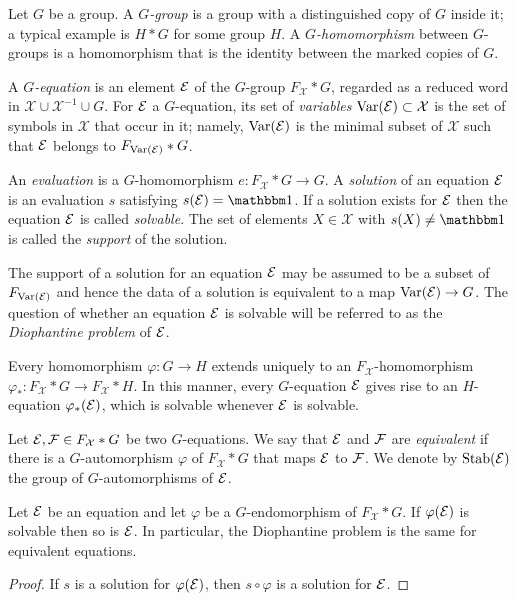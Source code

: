 \documentclass[a4paper,11pt]{amsart}
\begin{document}
\begin{defi}
  Let $G$ be a group. A \emph{$G$-group} is a group with a
  distinguished copy of $G$ inside it; a typical example is 
  $H*G$ for some group $H$. A \emph{$G$-homomorphism} 
  between $G$-groups is a homomorphism
  that is the identity between the marked copies of $G$.

  A \emph{$G$-equation} is an element $\mathcal{E}$ of the $G$-group
  $F_{\mathcal{X}} * G$, regarded as a reduced word in
  $\mathcal X\cup\mathcal X^{-1}\cup G$. For $\mathcal{E}$ a $G$-equation,
  its set of \emph{variables} $\textup{Var}(\mathcal{E})\subset \mathcal{X}$ is the
  set of symbols in $\mathcal{X}$ that occur in it; namely,
  $\textup{Var}(\mathcal{E})$ is the minimal subset of $\mathcal{X}$ such that
  $\mathcal{E}$ belongs to $F_{\textup{Var}(\mathcal{E})}*G$.

  An \emph{evaluation} is a $G$-homomorphism $e\colon F_{\mathcal{X}} * G \to G$.
  A \emph{solution} of an equation $\mathcal{E}$ is an evaluation $s$
  satisfying $s(\eq{E})=\id$. If a solution exists for $\mathcal{E}$ then the
  equation $\mathcal{E}$ is called \emph{solvable}. The set of elements
  $X\in \mathcal{X}$ with $s(X)\neq\id$ is called the \emph{support} of the solution.
\end{defi}

The support of a solution for an equation $\mathcal{E}$ may be assumed to be
a subset of $F_{\textup{Var}(\mathcal{E})}$ and hence the data of a solution
is equivalent to a map $\textup{Var}(\mathcal{E}) \to G$.  The question of whether an
equation $\mathcal{E}$ is solvable will be referred to as the \emph{Diophantine
problem} of $\mathcal{E}$.

Every homomorphism $\varphi \colon G \to H$ extends uniquely to an
$F_{\mathcal{X}}$-homomorphism
$\varphi_* \colon F_{\mathcal{X}}*G \to F_{\mathcal{X}}*H$.  In this
manner, every $G$-equation $\mathcal{E}$ gives rise to an $H$-equation
$\varphi_*(\mathcal{E})$, which is solvable whenever $\mathcal{E}$ is solvable.

\begin{defi}
  Let $\mathcal{E},\mathcal{F}\in F_{\mathcal{X}}* G$ be two $G$-equations. We
  say that $\mathcal{E}$ and $\mathcal{F}$ are \emph{equivalent} if there is a
  $G$-automorphism $\varphi$ of $F_{\mathcal{X}}*G$ that maps $\mathcal{E}$
  to $\mathcal{F}$. We denote by $\operatorname{Stab}(\mathcal{E})$ the group of
  $G$-automorphisms of $\mathcal{E}$.
\end{defi}
\begin{lem}
  Let $\mathcal{E}$ be an equation and let $\varphi$ be a $G$-endomorphism of
  $F_{\mathcal{X}}*G$. If $\varphi(\mathcal{E})$ is solvable then so is $\mathcal{E}$. In particular,
  the Diophantine problem is the same for equivalent equations.
\end{lem}
\begin{proof}
  If $s$ is a solution for $\varphi(\mathcal{E})$, then $s\circ\varphi$ is a
  solution for $\mathcal{E}$.
\end{proof}
\end{document}
